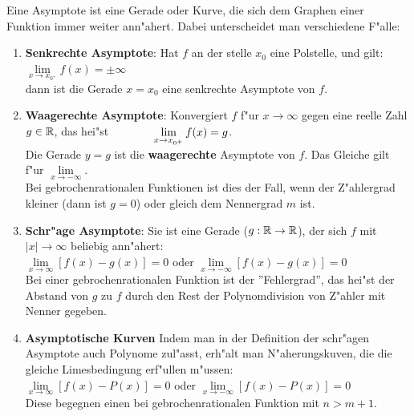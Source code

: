 Eine Asymptote ist eine Gerade oder Kurve, die sich dem Graphen einer Funktion immer weiter ann"ahert. Dabei unterscheidet man verschiedene F"alle:\\
\begin{Definition}
\begin{enumerate}
\item \textbf{Senkrechte Asymptote}: Hat $f$ an der stelle $x_{0}$ eine Polstelle, und gilt:\\
\indent \qquad $\lim\limits_{x \rightarrow x_{0^{+}}} f(x) = \pm \infty$\\
dann ist die Gerade $x=x_{0}$ eine senkrechte Asymptote von $f$.\\
\item \textbf{Waagerechte Asymptote}: Konvergiert $f$ f"ur $x\rightarrow \infty$ gegen eine reelle Zahl $g\in \mathbb{R}$, das hei"st $\indent \qquad\lim\limits_{x \rightarrow x_{0^{+}}}{f(x)}=g$.\\
Die Gerade $y=g$ ist die \textbf{waagerechte} Asymptote von $f$. Das Gleiche gilt f"ur $\lim\limits_{x \rightarrow -\infty}$.\\
Bei gebrochenrationalen Funktionen ist dies der Fall, wenn der Z"ahlergrad kleiner (dann ist $g=0$) oder gleich dem Nennergrad $m$ ist.\\
\item \textbf{Schr"age Asymptote}: Sie ist eine Gerade ($g:\mathbb{R} \rightarrow \mathbb{R}$), der sich $f$ mit $|x|\rightarrow \infty$ beliebig ann"ahert:\\
\indent \qquad$\lim\limits_{x \rightarrow \infty}{[f(x)-g(x)]}=0$ oder $\lim\limits_{x \rightarrow -\infty}{[f(x)-g(x)]}=0$\\
Bei einer gebrochenrationalen Funktion ist der ''Fehlergrad'', das hei"st der Abstand von $g$ zu $f$ durch den Rest der Polynomdivision von Z"ahler mit Nenner gegeben.\\
\item \textbf{Asymptotische Kurven} Indem man in der Definition der schr"agen Asymptote auch Polynome zul"asst, erh"alt man N"aherungskuven, die die gleiche Limesbedingung erf"ullen m"ussen:\\
\indent \qquad$\lim\limits_{x \rightarrow \infty}{[f(x)-P(x)]}=0$ oder $\lim\limits_{x \rightarrow -\infty}{[f(x)-P(x)]}=0$\\
Diese begegnen einen bei gebrochenrationalen Funktion mit $n>m+1$.\\
\end{enumerate}
\end{Definition}

